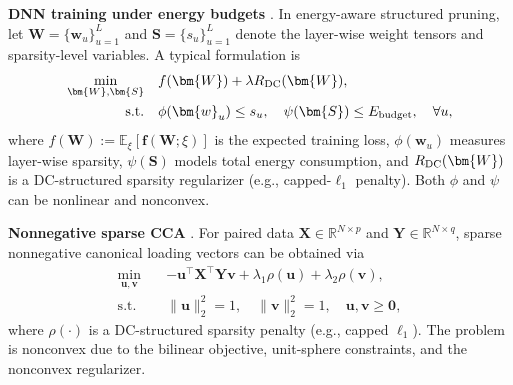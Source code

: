 \documentclass{article}
\theoremstyle{plain}
\theoremstyle{definition}
\theoremstyle{remark}
\newcommand{\zero}{\bm{0}}
\newcommand{\RR}{\mathbb{R}}
\newcommand{\bX}{\bm{X}}
\newcommand{\bu}{\bm{u}}
\newcommand{\bY}{\bm{Y}}
\newcommand{\bv}{\bm{v}}
\newcommand{\bw}{\bm{w}}
\newcommand{\bS}{\bm{S}}
\newcommand{\bW}{\bm{W}}
\newcommand{\tf}{\mathbf{f}}
\numberwithin{equation}{section}
\begin{document}
\textbf{DNN training under energy budgets} \citep{yang2019ecc}.
In energy-aware structured pruning, let $\bW=\{\bw_u\}_{u=1}^L$ and 
$\bS=\{s_u\}_{u=1}^L$ denote the layer-wise weight tensors and 
sparsity-level variables. A typical formulation is 
\begin{equation*}
\begin{aligned}
\min_{\bW,\bS} \quad &
f(\bW) + \lambda R_{\rm DC}(\bW), \\
\text{s.t.} \quad &
\phi(\bw_u) \leq s_u,\quad
\psi(\bS) \leq E_{\rm budget},\quad \forall u,
\end{aligned}
\end{equation*}
where $f(\bW):=\mathbb{E}_{\xi}[\tf(\bW;\xi)]$ is the expected training 
loss, $\phi(\bw_u)$ measures layer-wise sparsity, $\psi(\bS)$ models 
total energy consumption, and $R_{\rm DC}(\bW)$ is a DC-structured 
sparsity regularizer (e.g., capped-$\ell_1$ penalty). Both $\phi$ and 
$\psi$ can be nonlinear and nonconvex.

\textbf{Nonnegative sparse CCA} \citep{witten2009penalized}.
For paired data $\bX\in\RR^{N\times p}$ and $\bY\in\RR^{N\times q}$, 
sparse nonnegative canonical loading vectors can be obtained via
\begin{equation*}
\begin{aligned}
\min_{\bu,\bv} \quad &
-\bu^\top \bX^\top \bY \bv
+ \lambda_1 \rho(\bu) + \lambda_2 \rho(\bv), \\
\text{s.t.} \quad &
\|\bu\|_2^2 = 1,\quad
\|\bv\|_2^2 = 1,\quad
\bu, \bv \geq \zero,
\end{aligned}
\end{equation*}
where $\rho(\cdot)$ is a DC-structured sparsity penalty (e.g., capped 
$\ell_1$). The problem is nonconvex due to the bilinear objective, 
unit-sphere constraints, and the nonconvex regularizer.
\end{document}
